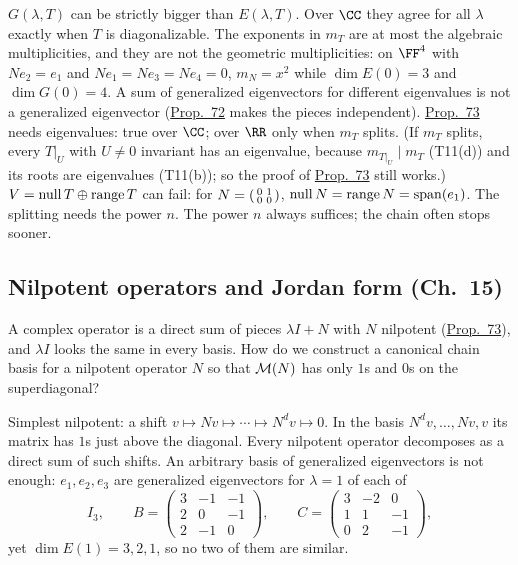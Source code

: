 \documentclass[10pt]{scrartcl}
\begin{document}
\begin{trapbox}
  \ii $G(\lambda,T)$ can be strictly bigger than $E(\lambda,T)$. Over $\CC$ they agree for all $\lambda$ exactly when $T$ is diagonalizable.
  \ii The exponents in $m_T$ are at most the algebraic multiplicities, and they are not the geometric multiplicities: on $\FF^4$ with $Ne_2=e_1$ and $Ne_1=Ne_3=Ne_4=0$, $m_N=x^2$ while $\dim E(0)=3$ and $\dim G(0)=4$.
  \ii A sum of generalized eigenvectors for different eigenvalues is not a generalized eigenvector (\hyperref[prop-72]{Prop.~72} makes the pieces independent).
  \ii \hyperref[prop-73]{Prop.~73} needs eigenvalues: true over $\CC$; over $\RR$ only when $m_T$ splits. (If $m_T$ splits, every $T|_U$ with $U\ne0$ invariant has an eigenvalue, because $m_{T|_U}\mid m_T$ (T11(d)) and its roots are eigenvalues (T11(b)); so the proof of \hyperref[prop-73]{Prop.~73} still works.)
  \ii $V=\operatorname{null} T\oplus\operatorname{range} T$ can fail: for $N=\begin{psmallmatrix}0&1\\0&0\end{psmallmatrix}$, $\operatorname{null} N=\operatorname{range} N=\operatorname{span}(e_1)$. The splitting needs the power $n$.
  \ii The power $n$ always suffices; the chain often stops sooner.
\end{trapbox}



\subsection{Nilpotent operators and Jordan form (Ch.~15)}

\begin{qbox}
  A complex operator is a direct sum of pieces $\lambda I+N$ with $N$ nilpotent (\hyperref[prop-73]{Prop.~73}), and $\lambda I$ looks the same in every basis. How do we construct a canonical chain basis for a nilpotent operator $N$ so that $\mathcal M(N)$ has only $1$s and $0$s on the superdiagonal?
  \begin{itemize}
    \ii Simplest nilpotent: a shift $v\mapsto Nv\mapsto\cdots\mapsto N^dv\mapsto0$. In the basis $N^dv,\dots,Nv,v$ its matrix has $1$s just above the diagonal.
    \ii Every nilpotent operator decomposes as a direct sum of such shifts.
    \ii An arbitrary basis of generalized eigenvectors is not enough: $e_1,e_2,e_3$ are generalized eigenvectors for $\lambda=1$ of each of
    \[
      I_3, \qquad B=\begin{pmatrix}3&-1&-1\\2&0&-1\\2&-1&0\end{pmatrix}, \qquad C=\begin{pmatrix}3&-2&0\\1&1&-1\\0&2&-1\end{pmatrix},
    \]
    yet $\dim E(1)=3,2,1$, so no two of them are similar.
  \end{itemize}
\end{qbox}
\end{document}
